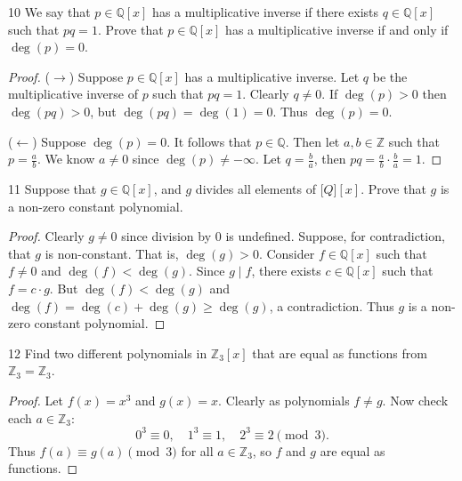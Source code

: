 \begin{problem}{10}
    We say that $p \in \mathbb{Q}[x]$ has a multiplicative inverse 
    if there exists $q \in \mathbb{Q}[x]$ such that $pq = 1$.
    Prove that $p \in \mathbb{Q}[x]$ has a multiplicative inverse 
    if and only if $\deg(p) = 0$.
\end{problem}
\solved

\begin{proof}
    ($\rightarrow$) Suppose $p \in \mathbb{Q}[x]$ has a multiplicative inverse.
    Let $q$ be the multiplicative inverse of $p$ such that $p q = 1$.
    Clearly $q \ne 0$.
    If $\deg(p) > 0$ then $\deg(pq) > 0$, but $\deg(pq) = \deg(1) = 0$.
    Thus $\deg(p) = 0$.

    ($\leftarrow$) Suppose $\deg(p) = 0$. It follows that $p \in \mathbb{Q}$.
    Then let $a, b \in \mathbb{Z}$ such that $p = \frac{a}{b}$.
    We know $a \ne 0$ since $\deg(p) \ne -\infty$.
    Let $q = \frac{b}{a}$, then $p q = \frac{a}{b} \cdot \frac{b}{a} = 1$.
\end{proof}

\begin{problem}{11}
    Suppose that $g \in \mathbb{Q}[x]$, and $g$ divides all elements 
    of $\mathbb[Q][x]$. Prove that $g$ is a non-zero constant polynomial.
\end{problem}
\solved

\begin{proof}
    Clearly $g \ne 0$ since division by $0$ is undefined.  
    Suppose, for contradiction, that $g$ is non-constant. That is, $\deg(g) > 0$.  
    Consider $f \in \mathbb{Q}[x]$ such that $f \ne 0$ and $\deg(f) < \deg(g)$.
    Since $g \mid f$, there exists $c \in \mathbb{Q}[x]$ such that 
        $f = c \cdot g$.
    But $\deg(f) < \deg(g)$ and $\deg(f) = \deg(c) + \deg(g) \ge \deg(g)$,
        a contradiction.  
    Thus $g$ is a non-zero constant polynomial.
\end{proof}

\begin{problem}{12}
    Find two different polynomials in $\mathbb{Z}_3[x]$ that are equal 
    as functions from $\mathbb{Z}_3 = \mathbb{Z}_3$.
\end{problem}
\solved

\begin{proof}
    Let $f(x) = x^3$ and $g(x) = x$.
    Clearly as polynomials $f \ne g$.
    Now check each $a \in \mathbb{Z}_3$:
    \[
    0^3 \equiv 0, \quad 1^3 \equiv 1, \quad 2^3 \equiv 2 \pmod{3}.
    \]
    Thus $f(a) \equiv g(a) \pmod{3}$ for all $a \in \mathbb{Z}_3$, so $f$ and $g$ are equal as functions.
\end{proof}

